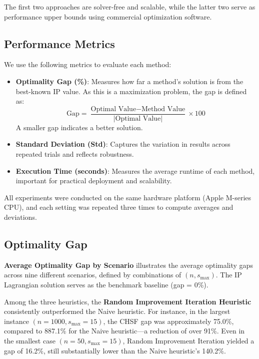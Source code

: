 The first two approaches are solver-free and scalable, while the latter two serve as performance upper bounds using commercial optimization software.

\subsection{Performance Metrics}

We use the following metrics to evaluate each method:

\begin{itemize}
    \item \textbf{Optimality Gap (\%)}: Measures how far a method's solution is from the best-known IP value. As this is a maximization problem, the gap is defined as:
    \[
    \text{Gap} = \frac{\text{Optimal Value} - \text{Method Value}}{|\text{Optimal Value}|} \times 100
    \]
    A smaller gap indicates a better solution.
    
    \item \textbf{Standard Deviation (Std)}: Captures the variation in results across repeated trials and reflects robustness.
    
    \item \textbf{Execution Time (seconds)}: Measures the average runtime of each method, important for practical deployment and scalability.
\end{itemize}

All experiments were conducted on the same hardware platform (Apple M-series CPU), and each setting was repeated three times to compute averages and deviations.

\subsection{Optimality Gap}

\textbf{Average Optimality Gap by Scenario} illustrates the average optimality gaps across nine different scenarios, defined by combinations of $(n, s_{\max})$. The IP Lagrangian solution serves as the benchmark baseline (gap = 0\%). 

Among the three heuristics, the \textbf{Random Improvement Iteration Heuristic} consistently outperformed the Naive heuristic. For instance, in the largest instance $(n=1000, s_{\max}=15)$, the CHSF gap was approximately 75.0\%, compared to 887.1\% for the Naive heuristic—a reduction of over 91\%. Even in the smallest case $(n=50, s_{\max}=15)$, Random Improvement Iteration yielded a gap of 16.2\%, still substantially lower than the Naive heuristic’s 140.2\%.

